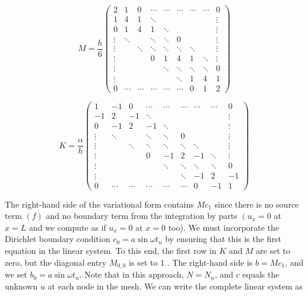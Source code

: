 \documentclass[../main.tex]{subfiles}
\begin{document}
	\begin{equation}
		\label{244}
		 M=\frac{h}{6}\left(
		 \begin{array}{ccccccccc}2 & 1 & 0 & \cdots & \cdots & \cdots & \cdots & \cdots & 0 \\ 1 & 4 & 1 & \ddots & & & & & \vdots \\ 0 & 1 & 4 & 1 & \ddots & & & & \vdots \\ \vdots & \ddots & & \ddots & \ddots & 0 & & & \vdots \\ \vdots & & \ddots & \ddots & \ddots & \ddots & \ddots & & \vdots \\ \vdots & & & 0 & 1 & 4 & 1 & \ddots & \vdots \\ \vdots & & & & \ddots & \ddots & \ddots & \ddots & 0 \\ \vdots & & & & & \ddots & 1 & 4 & 1 \\ 0 & \cdots & \cdots & \cdots & \cdots & \cdots & 0 & 1 & 2\end{array}\right)
	\end{equation}	 
	
	\begin{equation}
		\label{245}
		 K=\frac{\alpha}{h}\left(\begin{array}{ccccccccc}1 & -1 & 0 & \cdots & \cdots & \cdots & \cdots & \cdots & 0 \\ -1 & 2 & -1 & \ddots & & & & & \vdots \\ 0 & -1 & 2 & -1 & \ddots & & & & \vdots \\ \vdots & \ddots & & \ddots & \ddots & 0 & & & \vdots \\ \vdots & & \ddots & \ddots & \ddots & \ddots & \ddots & & \vdots \\ \vdots & & & 0 & -1 & 2 & -1 & \ddots & \vdots \\ \vdots & & & & \ddots & \ddots & \ddots & \ddots & 0 \\ \vdots & & & & & \ddots & -1 & 2 & -1 \\ 0 & \cdots & \cdots & \cdots & \cdots & \cdots & 0 & -1 & 1\end{array}\right)
	\end{equation}
		 
		 \noindent The right-hand side of the variational form contains $M c_{1}$ since there is no source term $(f)$ and no boundary term from the integration by parts $\left(u_{x}=0\right.$ at $x=L$ and we compute as if $u_{x}=0$ at $x=0$ too). We must incorporate the Dirichlet boundary condition $c_{0}=a \sin \omega t_{n}$ by ensuring that this is the first equation in the linear system. To this end, the first row in $K$ and $M$ are set to zero, but the diagonal entry $M_{0,0}$ is set to 1 . The right-hand side is $b=M c_{1}$, and we set $b_{0}=a \sin \omega t_{n}$. Note that in this approach, $N=N_{n}$, and $c$ equals the unknown $u$ at each node in the mesh. We can write the complete linear system as
		 
\end{document}
